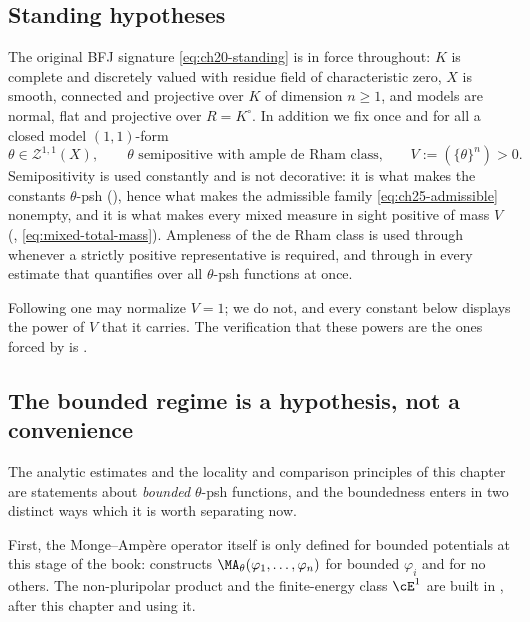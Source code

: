 \subsection{Standing hypotheses}
\label{sec:ch25-hypotheses}

The original BFJ signature \eqref{eq:ch20-standing} is in force throughout:
$K$ is complete and discretely valued with residue field of characteristic
zero, $X$ is smooth, connected and projective over $K$ of dimension
$n\geq1$, and models are normal, flat and projective over $R=K^\circ$.
In addition we fix once and for all a closed model $(1,1)$-form
\begin{equation}
\label{eq:ch25-reference-form}
 \theta\in\mathcal Z^{1,1}(X),
 \qquad\text{$\theta$ semipositive with ample de Rham class,}
 \qquad V:=(\{\theta\}^n)>0 .
\end{equation}
Semipositivity is used constantly and is not decorative: it is what makes the
constants $\theta$-psh (), hence what makes the
admissible family \eqref{eq:ch25-admissible} nonempty, and it is what makes
every mixed measure in sight positive of mass $V$
(, \eqref{eq:mixed-total-mass}).  Ampleness of the
de Rham class is used through
 whenever a strictly positive
representative is required, and through
 in every estimate that quantifies over
all $\theta$-psh functions at once.

Following \cite[\S\S4--5]{BFJ15} one may normalize $V=1$; we do not, and
every constant below displays the power of $V$ that it carries.  The
verification that these powers are the ones forced by
 is .

\subsection{The bounded regime is a hypothesis, not a convenience}
\label{sec:ch25-bounded-regime}

The analytic estimates and the locality and comparison principles of this
chapter are statements about \emph{bounded} $\theta$-psh functions, and the
boundedness enters in two distinct ways which it is worth separating now.

First, the Monge--Amp\`ere operator itself is only defined for bounded
potentials at this stage of the book: 
constructs $\MA_\theta(\varphi_1,\ldots,\varphi_n)$ for bounded
$\varphi_i$ and for no others.  The non-pluripolar product
 and the finite-energy class $\cE^1$ are built
in , after this chapter and using it.

